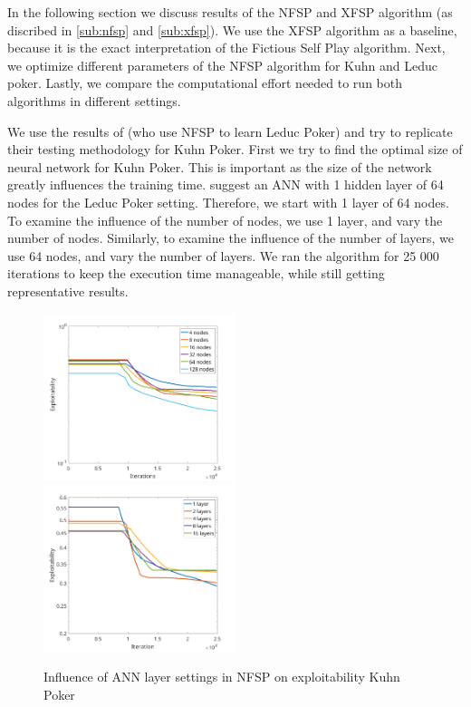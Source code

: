 \documentclass[10pt,a4paper]{article}
\begin{document}
In the following section we discuss results of the NFSP and XFSP algorithm (as discribed in \ref{sub:nfsp} and \ref{sub:xfsp}). We use the XFSP algorithm as a baseline, because it is the exact interpretation of the Fictious Self Play algorithm. Next, we optimize different parameters of the NFSP algorithm for Kuhn and Leduc poker. Lastly, we compare the computational effort needed to run both algorithms in different settings.

We use the results of \citeauthor{heinrichphd} \cite{heinrichphd} (who use NFSP to learn Leduc Poker) and try to replicate their testing methodology for Kuhn Poker.
First we try to find the optimal size of neural network for Kuhn Poker. This is important as the size of the network greatly influences the training time.
\citeauthor{heinrichphd} \cite{heinrichphd} suggest an ANN with 1 hidden layer of 64 nodes for the Leduc Poker setting. Therefore, we start with 1 layer of 64 nodes. To examine the influence of the number of nodes, we use 1 layer, and vary the number of nodes. Similarly, to examine the influence of the number of layers, we use 64 nodes, and vary the number of layers.
We ran the algorithm for 25 000 iterations to keep the execution time manageable, while still getting representative results.

\begin{center}
\begin{figure}[h]
\label{fig:layers_kuhn}
\includegraphics[width=0.5\textwidth]{Figures/kuhn_nodes.png}
\includegraphics[width=0.5\textwidth]{Figures/kuhn_layers.png}
\caption{Influence of ANN layer settings in NFSP on exploitability Kuhn Poker}
\end{figure}
\end{center}
\end{document}
